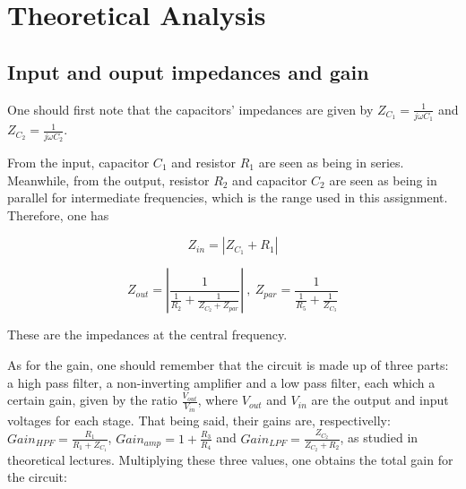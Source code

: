 \section{Theoretical Analysis}
\label{sec:analysis}



\subsection{Input and ouput impedances and gain}

One should first note that the capacitors' impedances are given by $Z_{C_1} = \frac{1}{j \omega C_1}$ and $Z_{C_2} = \frac{1}{j \omega C_2}$.



From the input, capacitor $C_1$ and resistor $R_1$ are seen as being in series. Meanwhile, from the output, resistor $R_2$ and capacitor $C_2$ are seen as being in parallel for intermediate frequencies, which is the range used in this assignment. Therefore, one has

\begin{equation}
Z_{in} = |Z_{C_1} + R_1|
\end{equation}

\begin{equation}
Z_{out} = \left|\frac{1}{\frac{1}{R_2} + \frac{1}{Z_{C_2} + Z_{par}}}\right| \ , \ Z_{par} = \frac{1}{\frac{1}{R_5} + \frac{1}{Z_{C_3}}}
\end{equation}

These are the impedances at the central frequency.




As for the gain, one should remember that the circuit is made up of three parts: a high pass filter, a non-inverting amplifier and a low pass filter, each which a certain gain, given by the ratio $\frac{V_{out}}{V_{in}}$, where $V_{out}$ and $V_{in}$ are the output and input voltages for each stage. That being said, their gains are, respectivelly: $Gain_{HPF} = \frac{R_1}{R_1 + Z_{C_1}}$, $Gain_{amp} = 1+\frac{R_3}{R_4}$ and $Gain_{LPF} = \frac{Z_{C_2}}{Z_{C_2}+R_2}$, as studied in theoretical lectures. Multiplying these three values, one obtains the total gain for the circuit:

